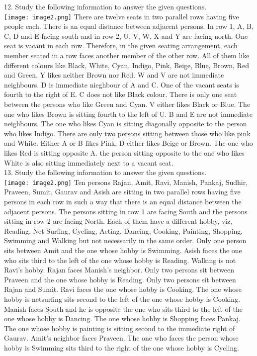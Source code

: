 \documentclass[
]{article}
\begin{document}
12. Study the following information to answer the given questions.\\
\texttt{[image: image2.png]}
There are twelve seats in two parallel rows having five people each. There is an equal
distance between adjacent persons. In row 1, A, B, C, D and E facing south and in row 2, U,
V, W, X and Y are facing north. One seat is vacant in each row. Therefore, in the given
seating arrangement, each member seated in a row faces another member of the other row.
All of them like different colours like Black, White, Cyan, Indigo, Pink, Beige, Blue, Brown,
Red and Green.
Y likes neither Brown nor Red. W and V are not immediate neighbours. D is immediate
nieghbour of A and C. One of the vacant seats is fourth to the right of E. C does not like
Black colour. There is only one seat between the persons who like Green and Cyan. V either
likes Black or Blue. The one who likes Brown is sitting fourth to the left of U. B and E are not
immediate neighbours. The one who likes Cyan is sitting diagonally opposite to the person
who likes Indigo. There are only two persons sitting between those who like pink and
White. Either A or B likes Pink. D either likes Beige or Brown. The one who likes Red is
sitting opposite A. the person sitting opposite to the one who likes White is also sitting
immediately next to a vacant seat.\\

13. Study the following information to answer the given questions.\\
\texttt{[image: image2.png]}
Ten persons Rajan, Amit, Ravi, Manish, Pankaj, Sudhir, Praveen, Sumit, Gaurav and Asish
are sitting in two parallel rows having five persons in each row in such a way that there is
an equal distance between the adjacent persons. The persons sitting in row 1 are facing
South and the persons sitting in row 2 are facing North. Each of them have a different
hobby, viz, Reading, Net Surfing, Cycling, Acting, Dancing, Cooking, Painting, Shopping,
Swimming and Walking but not necessarily in the same order. Only one person sits between
Amit and the one whose hobby is Swimming. Asish faces the one who sits third to the left of
the one whose hobby is Reading. Walking is not Ravi's hobby. Rajan faces Manish's
neighbor. Only two persons sit between Praveen and the one whose hobby is Reading. Only
two persons sit between Rajan and Sumit. Ravi faces the one whose hobby is Cooking. The
one whose hobby is netsurfing sits second to the left of the one whose hobby is Cooking.
Manish faces South and he is opposite the one who sits third to the left of the one whose
hobby is Dancing. The one whose hobby is Shopping faces Pankaj. The one whose hobby is
painting is sitting second to the immediate right of Gaurav. Amit's neighbor faces Praveen.
The one who faces the person whose hobby is Swimming sits third to the right of the one
whose hobby is Cycling.\\
\end{document}
